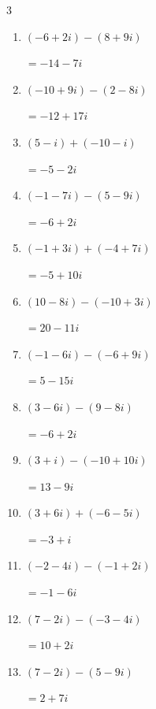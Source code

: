 \begin{multicols}{3}
\begin{enumerate}
        $\displaystyle =-18+2i$

  \item $\displaystyle (-6+2i) - (8+9i)$

        $\displaystyle =-14-7i$

\columnbreak %

  \item $\displaystyle (-10+9i) - (2-8i)$

        $\displaystyle =-12+17i$

  \item $\displaystyle (5-i) + (-10-i)$

        $\displaystyle =-5-2i$

  \item $\displaystyle (-1-7i) - (5-9i)$

        $\displaystyle =-6+2i$

  \item $\displaystyle (-1+3i) + (-4+7i)$

        $\displaystyle =-5+10i$

  \item $\displaystyle (10-8i) - (-10+3i)$

        $\displaystyle =20-11i$

  \item $\displaystyle (-1-6i) - (-6+9i)$

        $\displaystyle =5-15i$

  \item $\displaystyle (3-6i) - (9-8i)$

        $\displaystyle =-6+2i$

  \item $\displaystyle (3+i) - (-10+10i)$

        $\displaystyle =13-9i$

  \item $\displaystyle (3+6i) + (-6-5i)$

        $\displaystyle =-3+i$

  \item $\displaystyle (-2-4i) - (-1+2i)$

        $\displaystyle =-1-6i$

  \item $\displaystyle (7-2i) - (-3-4i)$

        $\displaystyle =10+2i$

  \item $\displaystyle (7-2i) - (5-9i)$

        $\displaystyle =2+7i$


\end{enumerate}
\end{multicols}
